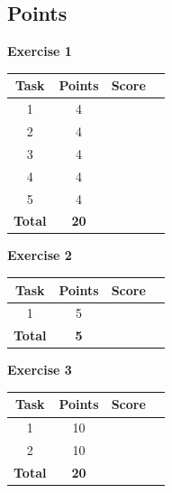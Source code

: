 \documentclass [11pt, a4wide, twoside]{article}
\begin{document}
\solution{}


\newpage
\subsection*{Points}

\begin{minipage}[t]{120pt}
\textbf{Exercise 1}
\vspace{5pt}\\
\begin{tabular}{|c|c|c|c|}
\hline
Task & Points & Score \\\hline
1 & 4 & \\\hline
2 & 4 & \\\hline
3 & 4 & \\\hline
4 & 4 & \\\hline
5 & 4 & \\\hline
\textbf{Total} & \textbf{20} &\\\hline\hline
\end{tabular}
\end{minipage}
\begin{minipage}[t]{120pt}


\textbf{Exercise 2}
\vspace{5pt}\\
\begin{tabular}{|c|c|c|c|}
\hline
Task & Points & Score \\\hline
1 & 5 & \\\hline
\textbf{Total} & \textbf{5} &\\\hline\hline
\end{tabular}
\end{minipage}
\begin{minipage}[t]{120pt}


\textbf{Exercise 3}
\vspace{5pt}\\
\begin{tabular}{|c|c|c|c|}
\hline
Task & Points & Score \\\hline
1 & 10 & \\\hline
2 & 10 & \\\hline
\textbf{Total} & \textbf{20} &\\\hline\hline
\end{tabular}
\end{minipage}
\end{document}
